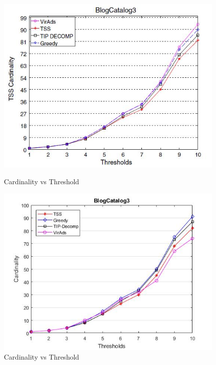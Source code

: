 \begin{figure}[h!]
\begin{minipage}[t]{0.50\textwidth}
\includegraphics[width=\linewidth,keepaspectratio=true]{images/bc3paper.jpg}
\caption{Cardinality vs Threshold}
\label{fase1}
\end{minipage}
\begin{minipage}[t]{0.50\textwidth}
\includegraphics[width=\linewidth,keepaspectratio=true]{images/bc3result.jpg}
\caption{Cardinality vs Threshold}
\end{minipage}
\end{figure}

